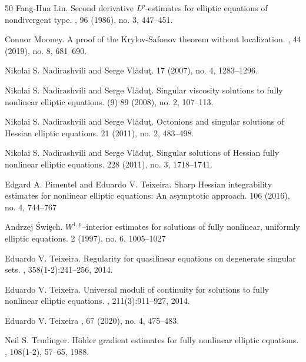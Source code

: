 \documentclass[10pt]{article} %
\begin{document}
\begin{thebibliography}{50}
Fang-Hua Lin.
\newblock Second derivative {$L^p$}-estimates for elliptic equations of nondivergent type.
, 96 (1986), no. 3, 447--451.

Connor Mooney.
\newblock A proof of the Krylov-Safonov theorem without localization.
, 44 (2019), no. 8, 681--690.

 Nikolai S. Nadirashvili and Serge Vl\u{a}du\c{t}.
 17 (2007), no. 4, 1283--1296.

 Nikolai S. Nadirashvili and Serge Vl\u{a}du\c{t}.
\newblock  Singular viscosity solutions to fully nonlinear elliptic equations.  
 (9) 89 (2008), no. 2, 107--113.

 Nikolai S. Nadirashvili and Serge Vl\u{a}du\c{t}.
\newblock Octonions and singular solutions of Hessian elliptic equations.  
 21 (2011), no. 2, 483--498.

 Nikolai S. Nadirashvili and Serge Vl\u{a}du\c{t}.
\newblock Singular solutions of Hessian fully nonlinear elliptic equations. 
 228 (2011), no. 3, 1718--1741.

 Edgard A. Pimentel and Eduardo V. Teixeira. 
\newblock
{Sharp Hessian integrability estimates for nonlinear elliptic equations: An asymptotic approach.} 
 106 (2016), no. 4, 744--767


 Andrzej \'Swi\c{e}ch. 
\newblock
{$W^{1,p}$--interior estimates for solutions of fully nonlinear, uniformly elliptic equations.} 
 2 (1997), no. 6, 1005--1027

Eduardo V. Teixeira.
\newblock Regularity for quasilinear equations on degenerate singular sets.
, 358(1-2):241--256, 2014.

Eduardo V. Teixeira.
\newblock Universal moduli of continuity for solutions to fully nonlinear
  elliptic equations.
, 211(3):911--927, 2014.

 Eduardo V. Teixeira
,  
 67 (2020), no. 4, 475--483.

Neil S. Trudinger.
\newblock H\"{o}lder gradient estimates for fully nonlinear elliptic equations.
, 108(1-2), 57--65, 1988.

\end{thebibliography}
\end{document}
